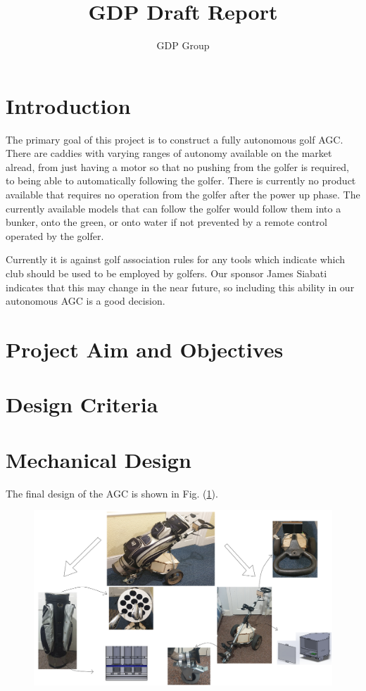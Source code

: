 \documentclass[11pt,landscape]{article}
\title{GDP Draft Report}
\author{GDP Group}
\begin{document}
\maketitle
\newpage
\begin{multicols}{3}
\tableofcontents
\newpage
\section{Introduction}
The primary goal of this project is to construct a fully autonomous golf AGC.
There are caddies with varying ranges of autonomy available on the market
alread, from just having a motor so that no pushing from the golfer is required,
to being able to automatically following the golfer. There is currently no
product available that requires no operation from the golfer after the power up
phase. The currently available models that can follow the golfer would follow
them into a bunker, onto the green, or onto water if not prevented by a remote
control operated by the golfer.

Currently it is against golf association rules for any tools which indicate
which club should be used to be employed by golfers. Our sponsor James Siabati
indicates that this may change in the near future, so including this ability in
our autonomous AGC is a good decision.
\section{Project Aim and Objectives}
\section{Design Criteria}
\newpage
\end{multicols}
\section{Mechanical Design}
The final design of the AGC is shown in Fig. (\ref{fig:complete_design}).
\begin{figure}[H]
    \begin{center}
        \includegraphics[width=\textwidth]{Complete Design.PNG}
        \label{fig:complete_design}
    \end{center}
\end{figure}
\end{document}
